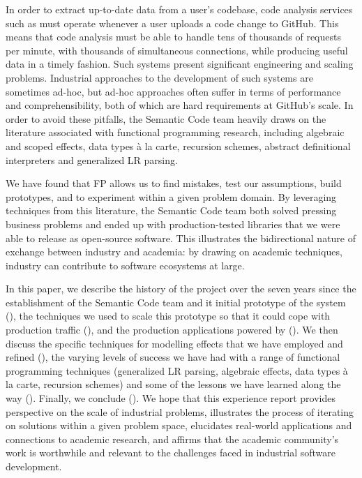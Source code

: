 \documentclass[acmsmall,fleqn,12pt]{acmart}
\begin{document}
In order to extract up-to-date data from a user’s codebase, code analysis
services such as \semantic{} must operate whenever a user uploads a code
change to GitHub. This means that code analysis must be able to handle tens
of thousands of requests per minute, with thousands of simultaneous
connections, while producing useful data in a timely fashion. Such systems
present significant engineering and scaling problems. Industrial approaches
to the development of such systems are sometimes ad-hoc, but ad-hoc
approaches often suffer in terms of performance and comprehensibility, both
of which are hard requirements at GitHub’s scale. In order to avoid these
pitfalls, the Semantic Code team heavily draws on the literature associated with
functional programming research, including algebraic and scoped effects,
data types \`a la carte, recursion schemes, abstract definitional interpreters
and generalized LR parsing.

We have found that FP allows us to find
mistakes, test our assumptions, build prototypes, and to experiment within a
given problem domain. By leveraging techniques from this literature, the
Semantic Code team both solved pressing business problems and ended up with
production-tested libraries that we were able to release as open-source
software. This illustrates the bidirectional nature of exchange between
industry and academia: by drawing on academic techniques, industry can
contribute to software ecosystems at large.

In this paper, we describe the history of the \semantic{} project over the
seven years since the establishment of the Semantic Code team
and it initial prototype of the system (),
the techniques we used to scale this prototype so that
it could cope with production traffic (), and the
production applications powered by \semantic{} ().
We then discuss the specific techniques for modelling effects that we have employed and refined
(), the varying levels of success
we have had with a range of functional programming techniques
(generalized LR parsing, algebraic effects, data types \`{a} la carte, recursion schemes)
and some of the lessons we have learned along the way
().
Finally, we conclude ().
We hope that this experience report
provides perspective on the scale of industrial problems, illustrates the
process of iterating on solutions within a given problem space, elucidates
real-world applications and connections to academic research, and affirms
that the academic community’s work is worthwhile and relevant to the
challenges faced in industrial software development.
\end{document}

